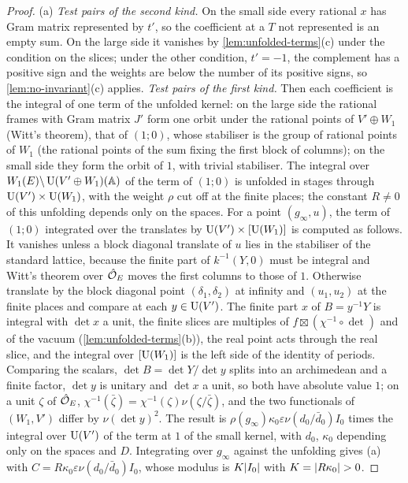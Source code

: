 \begin{proof}
(a) \emph{Test pairs of the second kind.} On the small side every rational $x$ has Gram matrix represented by $t'$, so the coefficient at a $T$ not represented is an empty sum. On the large side it vanishes by
\cref{lem:unfolded-terms}(c) under the condition on the slices; under the other condition, $t'=-1$, the complement has a positive sign and the weights are below the number of its positive signs, so
\cref{lem:no-invariant}(c) applies. \emph{Test pairs of the first kind.} Then each coefficient is the integral of one term of the unfolded kernel: on the large side the rational frames with Gram matrix $J'$ form
one orbit under the rational points of $V'\oplus W_1$ (Witt's theorem), that of $(1;0)$, whose stabiliser is the group of rational points of $W_1$ (the rational points of the sum fixing the first block
of columns); on the small side they form the orbit of $1$, with trivial stabiliser. The integral over $W_1(E)\backslash\operatorname{U}(V'\oplus W_1)(\mathbb{A})$ of the term of $(1;0)$ is unfolded in stages through $\operatorname{U}(V')\times\operatorname{U}(W_1)$, with the weight $\rho$ cut
off at the finite places; the constant $R\ne0$ of this unfolding depends only on the spaces. For a point $(g_\infty,u)$, the term of $(1;0)$ integrated over the translates by $\operatorname{U}(V')\times[\operatorname{U}(W_1)]$ is computed
as follows. It vanishes unless a block diagonal translate of $u$ lies in the stabiliser of the standard lattice, because the finite part of $k^{-1}(Y,0)$ must be integral and Witt's theorem over $\hat{\mathcal{O}}_E$ moves
the first columns to those of $1$. Otherwise translate by the block diagonal point $(\delta_1,\delta_2)$ at infinity and $(u_1,u_2)$ at the finite places and compare at each $y\in\operatorname{U}(V')$. The finite part $x$ of
$B=y^{-1}Y$ is integral with $\det x$ a unit, the finite slices are multiples of $f\boxtimes(\chi^{-1}\circ\det)$ and of the vacuum (\cref{lem:unfolded-terms}(b)), the real point acts through the real slice, and
the integral over $[\operatorname{U}(W_1)]$ is the left side of the identity of periods. Comparing the scalars, $\det B=\det Y/\det y$ splits into an archimedean and a finite factor, $\det y$ is unitary and $\det x$ a unit, so
both have absolute value $1$; on a unit $\zeta$ of $\hat{\mathcal{O}}_E$, $\chi^{-1}(\bar\zeta)=\chi^{-1}(\zeta)\nu(\zeta/\bar\zeta)$, and the two functionals of $(W_1,V')$ differ by $\nu(\det y)^2$. The result is
$\rho(g_\infty)\kappa_0\varepsilon\nu(d_0/\bar d_0)I_0$ times the integral over $\operatorname{U}(V')$ of the term at $1$ of the small kernel, with $d_0$, $\kappa_0$ depending only on the spaces and $D$. Integrating over
$g_\infty$ against the unfolding gives (a) with $C=R\kappa_0\varepsilon\nu(d_0/\bar d_0)I_0$, whose modulus is $K\lvert I_0\rvert$ with $K=\lvert R\kappa_0\rvert>0$.


\end{proof}
